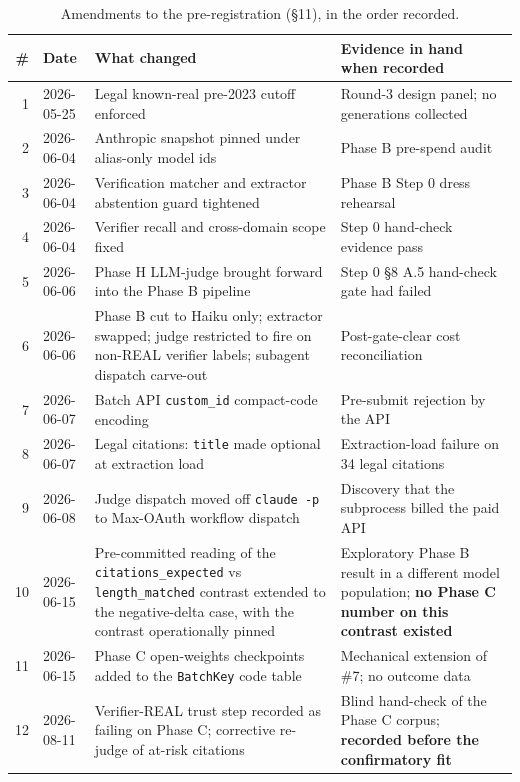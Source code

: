 \begin{table}[htbp]
\centering
\footnotesize
\caption{Amendments to the pre-registration (§11), in the order recorded.}
\label{tab:amendments}
\begin{tabular}{@{}r l p{} p{}@{}}
\toprule
\# & Date & What changed & Evidence in hand when recorded \\
\midrule
1 & 2026-05-25 & Legal known-real pre-2023 cutoff enforced & Round-3 design panel; no generations collected \\
2 & 2026-06-04 & Anthropic snapshot pinned under alias-only model ids & Phase B pre-spend audit \\
3 & 2026-06-04 & Verification matcher and extractor abstention guard tightened & Phase B Step 0 dress rehearsal \\
4 & 2026-06-04 & Verifier recall and cross-domain scope fixed & Step 0 hand-check evidence pass \\
5 & 2026-06-06 & Phase H LLM-judge brought forward into the Phase B pipeline & Step 0 §8 A.5 hand-check gate had failed \\
6 & 2026-06-06 & Phase B cut to Haiku only; extractor swapped; judge restricted to fire on non-REAL verifier labels; subagent dispatch carve-out & Post-gate-clear cost reconciliation \\
7 & 2026-06-07 & Batch API \texttt{custom\_id} compact-code encoding & Pre-submit rejection by the API \\
8 & 2026-06-07 & Legal citations: \texttt{title} made optional at extraction load & Extraction-load failure on 34 legal citations \\
9 & 2026-06-08 & Judge dispatch moved off \texttt{claude -p} to Max-OAuth workflow dispatch & Discovery that the subprocess billed the paid API \\
10 & 2026-06-15 & Pre-committed reading of the \texttt{citations\_expected} vs \texttt{length\_matched} contrast extended to the negative-delta case, with the contrast operationally pinned & Exploratory Phase B result in a different model population; \textbf{no Phase C number on this contrast existed} \\
11 & 2026-06-15 & Phase C open-weights checkpoints added to the \texttt{BatchKey} code table & Mechanical extension of \#7; no outcome data \\
12 & 2026-08-11 & Verifier-REAL trust step recorded as failing on Phase C; corrective re-judge of at-risk citations & Blind hand-check of the Phase C corpus; \textbf{recorded before the confirmatory fit} \\

\end{tabular}
\end{table}
